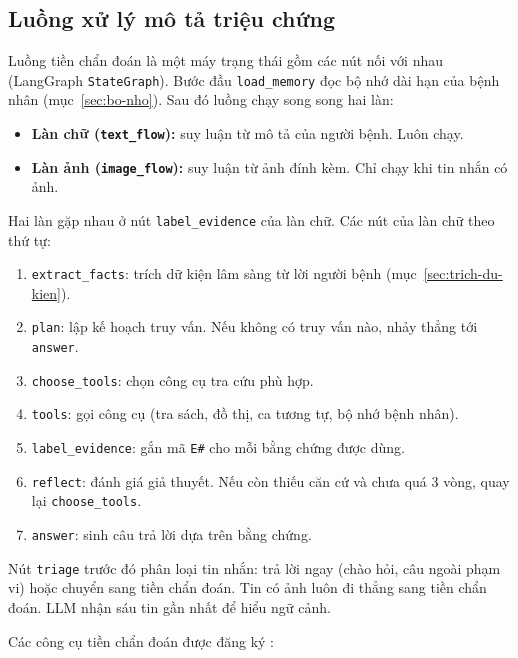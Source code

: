 \label{sec:tien-chan-doan}

\subsection{Luồng xử lý mô tả triệu chứng}

Luồng tiền chẩn đoán là một máy trạng thái gồm các nút nối với nhau (LangGraph \texttt{StateGraph}). Bước đầu \texttt{load\_memory} đọc bộ nhớ dài hạn của bệnh nhân (mục~\ref{sec:bo-nho}). Sau đó luồng chạy song song hai làn:

\begin{itemize}
  \item \textbf{Làn chữ (\texttt{text\_flow}):} suy luận từ mô tả của người bệnh. Luôn chạy.
  \item \textbf{Làn ảnh (\texttt{image\_flow}):} suy luận từ ảnh đính kèm. Chỉ chạy khi tin nhắn có ảnh.
\end{itemize}

Hai làn gặp nhau ở nút \texttt{label\_evidence} của làn chữ. Các nút của làn chữ theo thứ tự:

\begin{enumerate}
  \item \texttt{extract\_facts}: trích dữ kiện lâm sàng từ lời người bệnh (mục~\ref{sec:trich-du-kien}).
  \item \texttt{plan}: lập kế hoạch truy vấn. Nếu không có truy vấn nào, nhảy thẳng tới \texttt{answer}.
  \item \texttt{choose\_tools}: chọn công cụ tra cứu phù hợp.
  \item \texttt{tools}: gọi công cụ (tra sách, đồ thị, ca tương tự, bộ nhớ bệnh nhân).
  \item \texttt{label\_evidence}: gắn mã \texttt{E\#} cho mỗi bằng chứng được dùng.
  \item \texttt{reflect}: đánh giá giả thuyết. Nếu còn thiếu căn cứ và chưa quá 3 vòng, quay lại \texttt{choose\_tools}.
  \item \texttt{answer}: sinh câu trả lời dựa trên bằng chứng.
\end{enumerate}

Nút \texttt{triage} trước đó phân loại tin nhắn: trả lời ngay (chào hỏi, câu ngoài phạm vi) hoặc chuyển sang tiền chẩn đoán. Tin có ảnh luôn đi thẳng sang tiền chẩn đoán. LLM nhận sáu tin gần nhất để hiểu ngữ cảnh.

Các công cụ tiền chẩn đoán được đăng ký :


